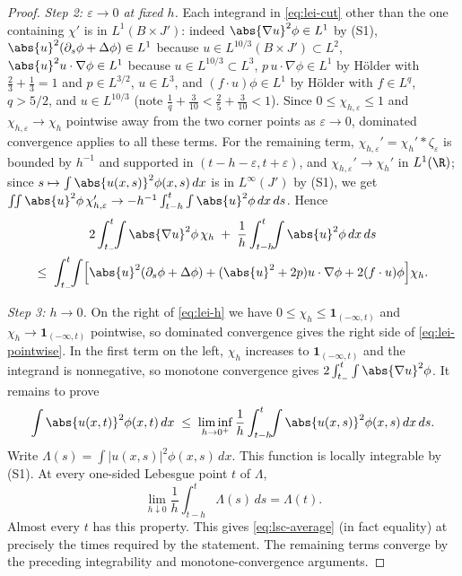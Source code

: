 \documentclass[11pt,reqno]{amsart}
\begin{document}
\begin{proof}
\emph{Step 2: $\varepsilon\to0$ at fixed $h$.} Each integrand in
\eqref{eq:lei-cut} other than the one containing $\chi'$ is in
$L^{1}(B\times J')$: indeed $\abs{\nabla u}^{2}\phi\in L^{1}$ by (S1),
$\abs{u}^{2}(\partial_{s}\phi+\Delta\phi)\in L^{1}$ because
$u\in L^{10/3}(B\times J')\subset L^{2}$, $\abs{u}^{2}u\cdot\nabla\phi\in L^{1}$
because $u\in L^{10/3}\subset L^{3}$, $p\,u\cdot\nabla\phi\in L^{1}$ by
H\"older with $\tfrac23+\tfrac13=1$ and $p\in L^{3/2}$, $u\in L^{3}$, and
$(f\cdot u)\phi\in L^{1}$ by H\"older with $f\in L^{q}$, $q>5/2$, and
$u\in L^{10/3}$ (note $\tfrac1q+\tfrac{3}{10}<\tfrac25+\tfrac3{10}<1$). Since
$0\le\chi_{h,\varepsilon}\le1$ and $\chi_{h,\varepsilon}\to\chi_{h}$ pointwise
away from the two corner points as $\varepsilon\to0$, dominated convergence
applies to all these terms. For the remaining term, $\chi_{h,\varepsilon}'
=\chi_{h}'*\zeta_{\varepsilon}$ is bounded by $h^{-1}$ and supported in
$(t-h-\varepsilon,t+\varepsilon)$, and $\chi_{h,\varepsilon}'\to\chi_{h}'$ in
$L^{1}(\R)$; since $s\mapsto\int\abs{u(x,s)}^{2}\phi(x,s)\,dx$ is in
$L^{\infty}(J')$ by (S1), we get
$\iint\abs{u}^{2}\phi\,\chi_{h,\varepsilon}'\to
 -h^{-1}\int_{t-h}^{t}\int\abs{u}^{2}\phi\,dx\,ds$. Hence
\begin{multline}\label{eq:lei-h}
  2\int_{t_{-}}^{t}\!\!\int\abs{\nabla u}^{2}\phi\,\chi_{h}
  \;+\;\frac1h\int_{t-h}^{t}\!\!\int\abs{u}^{2}\phi\,dx\,ds\\
  \le\;\int_{t_{-}}^{t}\!\!\int\Bigl[\abs{u}^{2}(\partial_{s}\phi+\Delta\phi)
    +(\abs{u}^{2}+2p)u\cdot\nabla\phi+2(f\cdot u)\phi\Bigr]\chi_{h} .
\end{multline}

\emph{Step 3: $h\to0$.} On the right of \eqref{eq:lei-h} we have
$0\le\chi_{h}\le\mathbf{1}_{(-\infty,t)}$ and $\chi_{h}\to\mathbf{1}_{(-\infty,t)}$
pointwise, so dominated convergence gives the right side of
\eqref{eq:lei-pointwise}. In the first term on the left, $\chi_{h}$ increases to
$\mathbf{1}_{(-\infty,t)}$ and the integrand is nonnegative, so monotone
convergence gives $2\int_{t_{-}}^{t}\int\abs{\nabla u}^{2}\phi$. It remains to
prove
\begin{equation}\label{eq:lsc-average}
  \int\abs{u(x,t)}^{2}\phi(x,t)\,dx
  \;\le\;\liminf_{h\to0^{+}}\frac1h\int_{t-h}^{t}\!\!\int\abs{u(x,s)}^{2}\phi(x,s)\,dx\,ds .
\end{equation}
Write $\Lambda(s)=\int|u(x,s)|^2\phi(x,s)\,dx$.
This function is locally integrable by (S1). At every one-sided
Lebesgue point $t$ of $\Lambda$,
\[
 \lim_{h\downarrow0}\frac1h\int_{t-h}^t\Lambda(s)\,ds=\Lambda(t).
\]
Almost every $t$ has this property. This gives \eqref{eq:lsc-average}
(in fact equality) at precisely the times required by the statement.
The remaining terms converge by the preceding integrability and
monotone-convergence arguments.
\end{proof}
\end{document}

